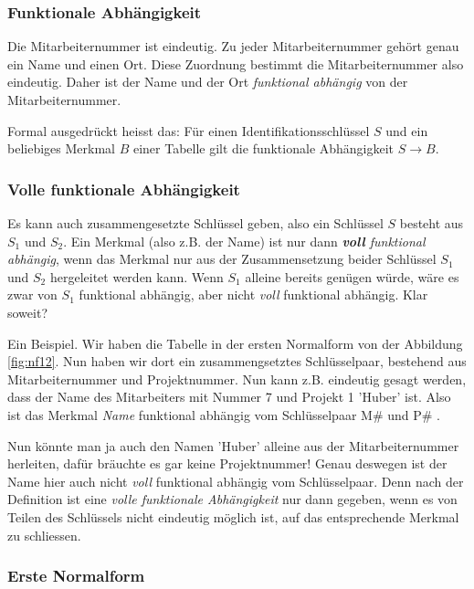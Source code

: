 \subsubsection{Funktionale Abhängigkeit}
Die Mitarbeiternummer ist eindeutig. Zu jeder Mitarbeiternummer gehört genau ein Name und einen Ort. Diese Zuordnung bestimmt die Mitarbeiternummer also eindeutig. Daher ist der Name und der Ort \emph{funktional abhängig} von der Mitarbeiternummer.

Formal ausgedrückt heisst das: Für einen Identifikationsschlüssel \(S\) und ein beliebiges Merkmal \(B\) einer Tabelle gilt die funktionale Abhängigkeit \(S \rightarrow B\).
\subsubsection{Volle funktionale Abhängigkeit}
Es kann auch zusammengesetzte Schlüssel geben, also ein Schlüssel \(S\) besteht aus \(S_{1}\) und \(S_{2}\). Ein Merkmal (also z.B. der Name) ist nur dann \emph{\textbf{voll} funktional  abhängig}, wenn das Merkmal nur aus der Zusammensetzung beider Schlüssel \(S_{1}\) und \(S_{2}\) hergeleitet werden kann. Wenn \(S_{1}\) alleine bereits genügen würde, wäre es zwar von \(S_{1}\) funktional abhängig, aber nicht \emph{voll} funktional abhängig. Klar soweit?

Ein Beispiel. Wir haben die Tabelle in der ersten Normalform von der Abbildung \ref{fig:nf12}. Nun haben wir dort ein zusammengsetztes Schlüsselpaar, bestehend aus Mitarbeiternummer und Projektnummer. Nun kann z.B. eindeutig gesagt werden, dass der Name des Mitarbeiters mit Nummer 7 und Projekt 1 'Huber' ist. Also ist das Merkmal \emph{Name} funktional abhängig vom Schlüsselpaar M\# und P\# .

Nun könnte man ja auch den Namen 'Huber' alleine aus der Mitarbeiternummer herleiten, dafür bräuchte es gar keine Projektnummer! Genau deswegen ist der Name hier auch nicht \emph{voll} funktional abhängig vom Schlüsselpaar. Denn nach der Definition ist eine \emph{volle funktionale Abhängigkeit} nur dann gegeben, wenn es von Teilen des Schlüssels nicht eindeutig möglich ist, auf das entsprechende Merkmal zu schliessen.

\subsubsection{Erste Normalform}
\begin{center}
\end{center}

